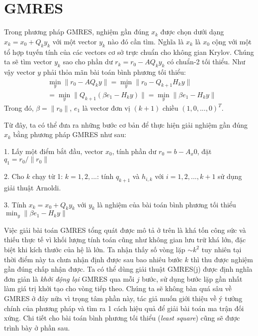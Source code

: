\section{GMRES}
Trong phương pháp GMRES, nghiệm gần đúng $x_k$ được chọn dưới dạng 
$x_k = x_0 + Q_k y_k$ với một vector $y_k$ nào đó cần tìm. Nghĩa là $x_k$ là $x_0$
cộng với một tổ hợp tuyến tính của các vectors cơ sở trực chuẩn cho không gian Krylov.
Chúng ta sẽ tìm vector $y_k$ sao cho phần dư $r_k = r_0 - AQ_k y_k$ có chuẩn-2 tối thiểu.
Như vậy vector $y$ phải thỏa mãn bài toán bình phương tối thiểu:
\begin{equation*}
    \begin{split}
        &\min_{y} \|r_0 - AQ_k y \| = \min_y \|r_0 - Q_{k+1}H_k y\| \\
        &= \min_{y} \|Q_{k+1}(\beta e_1 - H_k y)\| = \min_{y} \|\beta e_1 - H_k y\|
    \end{split}
\end{equation*}
Trong đó, $\beta = \|r_0\|$, $e_1$ là vector đơn vị $(k+1)$ chiều $(1,0,...,0)^T$.

Từ đây, ta có thể đưa ra những bước cơ bản để thực hiện giải nghiệm gần đúng $x_k$ 
bằng phương pháp GMRES như sau:

1. Lấy một điểm bắt đầu, vector $x_0$, tính phần dư $r_0 = b - A_x0$, đặt 
$q_1 = r_0 / \|r_0\|$

2. Cho $k$ chạy từ 1: $k=1,2,...$: tính $q_{k+1}$ và $h_{i,k}$ với 
$i = 1,2,...,k+1$ sử dụng giải thuật Arnoldi.

3. Tính $x_k = x_0 + Q_k y_k$ với $y_k$ là nghiệm của bài toán bình phương tối thiểu 
$\min_y \|\beta e_1 - H_k y\|$

Việc giải bài toán GMRES tổng quát được mô tả ở trên là khá tốn công sức và thiếu thực tế
vì khối lượng tính toán cũng như không gian lưu trữ khá lớn, đặc biệt khi kích thước của hệ 
là lớn. Ta nhận thấy số vòng lặp $\sim k^2$ tuy nhiên tại thời điểm này ta chưa nhận định được 
sau bao nhiêu bước $k$ thì thu được nghiệm gần đúng chấp nhận được. Ta có thể dùng giải thuật
GMRES(j) được định nghĩa đơn giản là \textit{khởi động lại} GMRES qua mỗi $j$ bước, sử dụng 
bước lặp gần nhất làm giá trị khởi tạo cho vòng tiếp theo. Chúng ta sẽ không bàn quá sâu về  GMRES
ở đây nữa vì trọng tâm phần này, tác giả muốn giới thiệu về ý tưởng chính của phương pháp và tìm 
ra 1 cách hiệu quả để giải bài toán ma trận đối xứng. Chi tiết cho bài toán bình phương tối thiểu 
(\textit{least square}) cũng sẽ được trình bày ở phần sau.